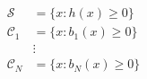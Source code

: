 \documentclass[preview]{standalone}
\begin{document}
\begin{align*}
\mathcal{S} &= \{ x : h(x) \geq 0 \}\\ \mathcal{C}_1 &= \{ x : b_1(x) \geq 0 \}\\ &\vdots\\ \mathcal{C}_N &= \{ x : b_N(x) \geq 0 \}
\end{align*}
\end{document}

